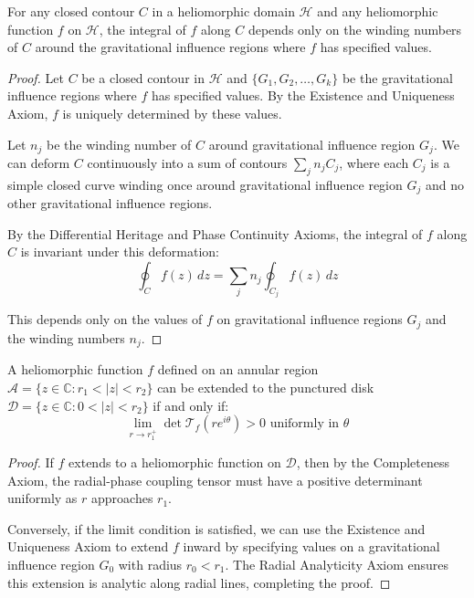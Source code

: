 \begin{theorem}
For any closed contour $C$ in a heliomorphic domain $\mathcal{H}$ and any heliomorphic function $f$ on $\mathcal{H}$, the integral of $f$ along $C$ depends only on the winding numbers of $C$ around the gravitational influence regions where $f$ has specified values.
\end{theorem}

\begin{proof}
Let $C$ be a closed contour in $\mathcal{H}$ and $\{G_1, G_2, \ldots, G_k\}$ be the gravitational influence regions where $f$ has specified values. By the Existence and Uniqueness Axiom, $f$ is uniquely determined by these values.

Let $n_j$ be the winding number of $C$ around gravitational influence region $G_j$. We can deform $C$ continuously into a sum of contours $\sum_j n_j C_j$, where each $C_j$ is a simple closed curve winding once around gravitational influence region $G_j$ and no other gravitational influence regions.

By the Differential Heritage and Phase Continuity Axioms, the integral of $f$ along $C$ is invariant under this deformation:
\begin{equation}
\oint_C f(z) \, dz = \sum_j n_j \oint_{C_j} f(z) \, dz
\end{equation}

This depends only on the values of $f$ on gravitational influence regions $G_j$ and the winding numbers $n_j$.
\end{proof}

\begin{theorem}
A heliomorphic function $f$ defined on an annular region $\mathcal{A} = \{z \in \mathbb{C} : r_1 < |z| < r_2\}$ can be extended to the punctured disk $\mathcal{D} = \{z \in \mathbb{C} : 0 < |z| < r_2\}$ if and only if:
\begin{equation}
\lim_{r \to r_1^+} \det\mathcal{T}_f(re^{i\theta}) > 0 \text{ uniformly in } \theta
\end{equation}
\end{theorem}

\begin{proof}
If $f$ extends to a heliomorphic function on $\mathcal{D}$, then by the Completeness Axiom, the radial-phase coupling tensor must have a positive determinant uniformly as $r$ approaches $r_1$.

Conversely, if the limit condition is satisfied, we can use the Existence and Uniqueness Axiom to extend $f$ inward by specifying values on a gravitational influence region $G_0$ with radius $r_0 < r_1$. The Radial Analyticity Axiom ensures this extension is analytic along radial lines, completing the proof.
\end{proof}

